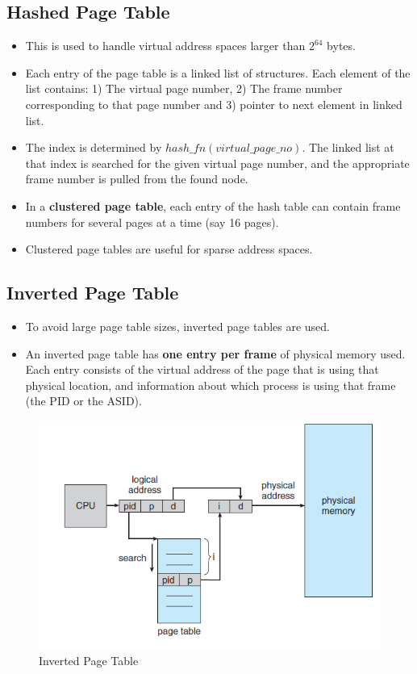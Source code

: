 \documentclass{article}
\theoremstyle{plain}
\theoremstyle{definition}
\begin{document}
\subsection{Hashed Page Table}
\begin{itemize}
    \item This is used to handle virtual address spaces larger than $2^{64}$ bytes.
    
    \item Each entry of the page table is a linked list of structures. Each element of the list contains: 1) The virtual page number, 2) The frame number corresponding to that page number and 3) pointer to next element in linked list.
    
    \item The index is determined by $hash\_fn(virtual\_page\_no)$. The linked list at that index is searched for the given virtual page number, and the appropriate frame number is pulled from the found node. 
    
    \item In a \textbf{clustered page table}, each entry of the hash table can contain frame numbers for several pages at a time (say 16 pages). 
    
    \item Clustered page tables are useful for sparse address spaces.
\end{itemize}

\subsection{Inverted Page Table}
\begin{itemize}
    \item To avoid large page table sizes, inverted page tables are used. 
    
    \item An inverted page table has \textbf{one entry per frame} of physical memory used. Each entry consists of the virtual address of the page that is using that physical location, and information about which process is using that frame (the PID or the ASID).
\end{itemize}
\begin{figure}[!h]
    \centering
    \includegraphics[scale=0.9]{os9.png}
    \caption{Inverted Page Table }
    \label{fig:my_label_9}
\end{figure}
\end{document}
